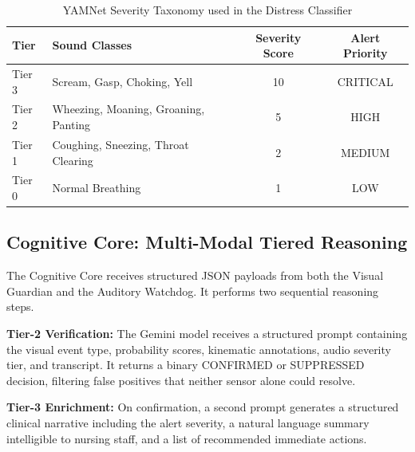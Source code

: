 \begin{table}[H]
    \centering
    \caption{YAMNet Severity Taxonomy used in the Distress Classifier}
    \label{tab:severity}
    \renewcommand{\arraystretch}{1.3}
    \begin{tabular}{|l|l|c|c|}
    \hline
    \textbf{Tier} & \textbf{Sound Classes} & \textbf{Severity Score} & \textbf{Alert Priority} \\ \hline
    Tier 3 & Scream, Gasp, Choking, Yell & 10 & CRITICAL \\ \hline
    Tier 2 & Wheezing, Moaning, Groaning, Panting & 5 & HIGH \\ \hline
    Tier 1 & Coughing, Sneezing, Throat Clearing & 2 & MEDIUM \\ \hline
    Tier 0 & Normal Breathing & 1 & LOW \\ \hline
    \end{tabular}
\end{table}

\subsection{Cognitive Core: Multi-Modal Tiered Reasoning}
\label{subsec:cognitive}

The Cognitive Core receives structured JSON payloads from both the Visual Guardian
and the Auditory Watchdog. It performs two sequential reasoning steps.

\textbf{Tier-2 Verification:} The Gemini model receives a structured prompt
containing the visual event type, probability scores, kinematic annotations,
audio severity tier, and transcript. It returns a binary CONFIRMED or SUPPRESSED
decision, filtering false positives that neither sensor alone could resolve.

\textbf{Tier-3 Enrichment:} On confirmation, a second prompt generates a
structured clinical narrative including the alert severity, a natural language
summary intelligible to nursing staff, and a list of recommended immediate actions.

